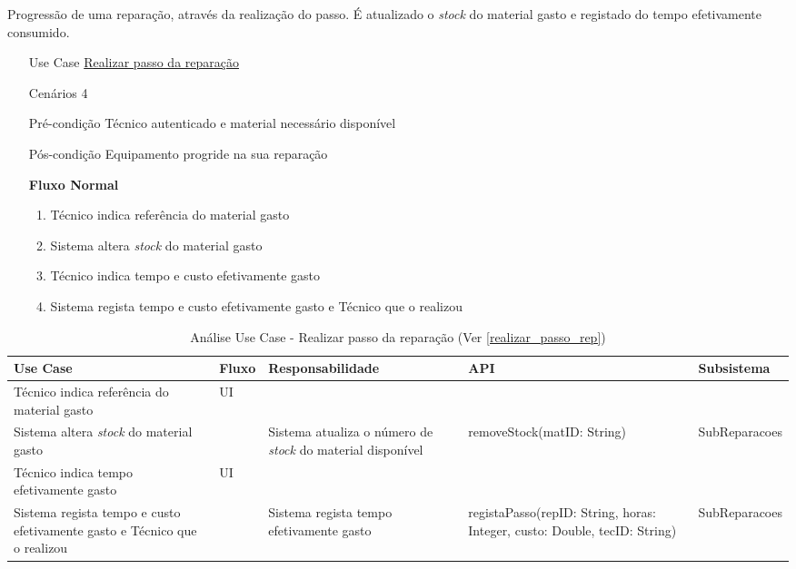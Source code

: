 \documentclass[../relatorio.tex]{subfiles}
\begin{document}
Progressão de uma reparação, através da realização do passo.
É atualizado o \textit{stock} do material gasto e registado do tempo efetivamente consumido.
\begin{itemize}
    \item[Use Case] {\underline{Realizar passo da reparação}}
    \item[Cenários] {4}
    \item[Pré-condição] {Técnico autenticado e material necessário disponível}
    \item[Pós-condição] {Equipamento progride na sua reparação}
          \begin{flushleft}
              \textbf{Fluxo Normal}
          \end{flushleft}
          \begin{enumerate}
              \item Técnico indica referência do material gasto
              \item Sistema altera \textit{stock} do material gasto
              \item Técnico indica tempo e custo efetivamente gasto 
              \item Sistema regista tempo e custo efetivamente gasto e Técnico que o realizou
          \end{enumerate}
\end{itemize}

\begin{landscape}
    \begin{table}[!h]
        \centering
        \begin{tabular}{|p{5cm}|p{1cm}|p{4cm}|p{6cm}|p{3cm}|}
            \hline
            \rowcolor{gray!20!white}
            Use Case & Fluxo & Responsabilidade & API & Subsistema \\
            \hline
            \rowcolor{yellow}
            Técnico indica referência do material gasto
                     & UI
                     &
                     &
                     &
            \\
            \hline
            Sistema altera \textit{stock} do material gasto
                     & 
                     & Sistema atualiza o número de \textit{stock} do material disponível
                     & removeStock(matID: String)
                     & SubReparacoes
            \\
            \hline
            \rowcolor{yellow}
            Técnico indica tempo efetivamente gasto
                     & UI
                     &
                     &
                     &
            \\
            \hline
            Sistema regista tempo e custo efetivamente gasto e Técnico que o realizou
                     &
                     & Sistema regista tempo efetivamente gasto
                     & registaPasso(repID: String, horas: Integer, custo: Double, tecID: String)
                     & SubReparacoes
            \\
            \hline
        \end{tabular}
        \caption{Análise Use Case - Realizar passo da reparação (Ver \ref{realizar_passo_rep})}
    \end{table}
\end{landscape}
\end{document}
